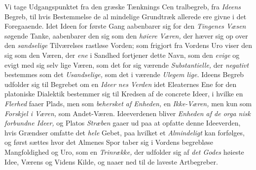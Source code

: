 Vi tage Udgangspunktet fra den græske Tænknings Cen\-%
tralbegreb, fra \emph{Ideens} Begreb, til hvis Bestemmelse de al\-%
mindelige Grundtræk allerede ere givne i det Foregaaende.
Idet Ideen for første Gang aabenbarer sig for den \emph{Tingenes
Væsen} søgende Tanke, aabenbarer den sig som den \emph{høiere
Væren,} der hæver sig op over den \emph{sandselige} Tilværelses
rastløse Vorden; som frigjort fra Vordens Uro viser den sig
som den Væren, der \emph{ene} i Sandhed fortjener dette Navn, som
den \emph{evige} og evigt med sig selv lige Væren, som det for sig
værende \emph{Substantielle,} der \emph{negativt} bestemmes som det
\emph{Usandselige,} som det i  værende \emph{Ulegem\-%
lige.} Ideens Begreb udfolder sig til Begrebet om en \emph{Ideer\-%
nes Verden} idet Eleaternes Ene for den platoniske Dialektik
bestemmer sig til Kredsen af de concrete Ideer, i hvilke en
 \setcounter{footnote}{0}%
\emph{Flerhed} faaer Plads, men som \emph{behersket af Enheden,}
en \emph{Ikke-Væren,} men kun som \emph{Forskjel i Væren,} som
Andet-Væren. Ideeverdenen bliver \emph{Enheden af de orga\-%
nisk forbundne Ideer,} og Platos \emph{Stræben} gaaer ud paa
at opfatte denne Ideeverden, hvis Grændser omfatte det \emph{hele}
Gebet, paa hvilket et \emph{Almindeligt} kan forfølges, og først
sættes hvor det Almenes Spor taber sig i Vordens begrebløse
Mangfoldighed og Uro, som en \emph{Trinrække,} der udfolder sig
af \emph{det Godes} høieste Idee, Værens og Videns Kilde, og naaer
ned til de laveste Artbegreber.

